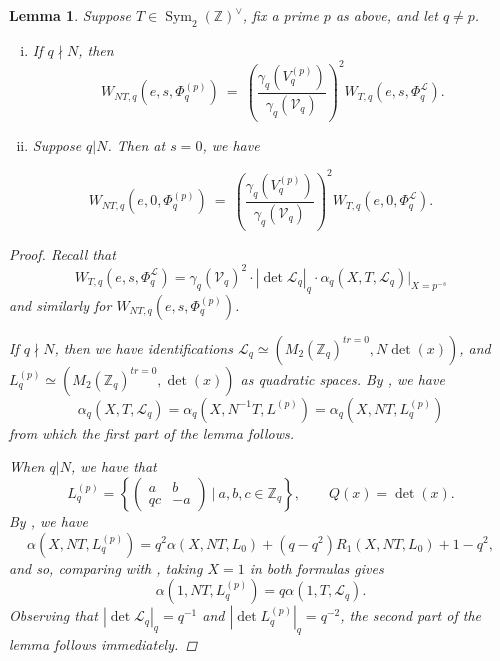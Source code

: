 \documentclass[reqno,oneside]{amsart}
\theoremstyle{plain}
\newtheorem{lemma}[theorem]{Lemma}
\theoremstyle{remark}
\numberwithin{theorem}{section}
\newcommand{\bbZ}{\mathbb Z}
\newcommand{\calL}{\mathcal L}
\newcommand{\calV}{\mathcal V}
\DeclareMathOperator{\Sym}{Sym}
\begin{document}
	
	\begin{lemma} \label{lem:Whittaker values shift}
		Suppose $T \in \Sym_2(\bbZ)^{\vee}$, fix a prime $p$ as above,  and let $q \neq p$.
		\begin{enumerate}[(i)]
			\item 	If $q \nmid N$, then
			\begin{equation*}
			W_{NT, q}(e, s, \Phi^{(p) }_q ) \ = \  \left( \frac{\gamma_q(V^{(p)}_q)}{\gamma_q(\calV_q)} \right)^2 W_{T, q}(e,s, \Phi^{\calL}_q).
			\end{equation*}
			\item Suppose $q | N$. Then at $s=0$, we have
		\end{enumerate}
		\begin{equation*}
		W_{NT, q}(e, 0, \Phi^{(p) }_q ) \ = \  \left( \frac{\gamma_q(V^{(p)}_q)}{\gamma_q(\calV_q)} \right)^2 W_{T, q}(e,0, \Phi^{\calL}_q).
		\end{equation*}
		\begin{proof}
			Recall that
			\begin{equation}
			W_{T,q}(e, s, \Phi^{\calL}_q) = \gamma_q(\calV_q)^2 \cdot |\det \calL_q|_q \cdot \alpha_q(X, T, \calL_q)|_{X= p^{-s}}
			\end{equation}
			and similarly for $W_{NT,q}(e, s, \Phi^{(p)}_q)$.
			
			If $q \nmid N$, then we have identifications $\calL_q \simeq (M_2(\bbZ_q)^{tr=0}, N \det(x))$, and $L^{(p)}_q \simeq (M_2(\bbZ_q)^{tr=0},  \det(x))$ as quadratic spaces. By \cite[Proposition 8.6]{YangLocal},  we have
			\begin{equation}
			\alpha_q(X, T, \calL_q) =\alpha_q(X, N^{-1} T, L^{(p)}) =\alpha_q(X, N T, L^{(p)}_q)
			\end{equation}
			from which the first part of the lemma follows.
			
			
			
			When $q | N$, we have that
			\begin{equation}
			L_q^{(p)} = \left\{ \begin{pmatrix} a & b \\ qc & -a \end{pmatrix} \ | \ a,b,c \in \bbZ_q  \right\}, \qquad Q(x) = \det (x).
			\end{equation}
			By \cite[Corollary 8.5]{YangLocal}, we have
			\begin{equation} \label{eq:Lp}
			\alpha(X, NT, L_q^{(p)}) = q^2 \alpha(X, NT, L_0) + (q-q^2) R_1(X, NT, L_0) + 1 - q^2,
			\end{equation}
			and so, comparing with , taking $X =1 $ in both formulas gives
			\begin{equation}
			\alpha(1, NT, L_q^{(p)}) = q \alpha(1, T, \calL_q).
			\end{equation}
			Observing that $|\det \calL_q|_q = q^{-1} $ and $|\det L^{(p)}_q|_q = q^{-2}$, the second part of the  lemma follows immediately.
		\end{proof}
		
	\end{lemma}
	
\end{document}

